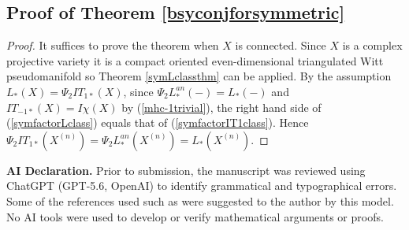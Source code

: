 \documentclass[11pt,leqno,twoside]{amsart}
\theoremstyle{plainsl}
\theoremstyle{definition}
\begin{document}
\subsection{Proof of Theorem \ref{bsyconjforsymmetric}}
\begin{proof} It suffices to prove the theorem when $X$ is connected.
 Since $X$ is a complex projective variety it is a compact oriented even-dimensional triangulated Witt pseudomanifold so Theorem \ref{symLclassthm} can be applied.
    By the assumption $L_*(X)=\Psi_2IT_{1*}(X)$, since $\Psi_2 L^{an}_*(-)=L_*(-)$ and $IT_{-1*}(X)=I\chi(X)$ by (\ref{mhc-1trivial}), the right hand side of (\ref{symfactorLclass}) equals that of (\ref{symfactorIT1class}). Hence $\Psi_2IT_{1*}(X^{(n)})=\Psi_2 L^{an}_*(X^{(n)})=L_*(X^{(n)})$.
\end{proof}







{\bf AI Declaration.} Prior to submission, the manuscript was reviewed using ChatGPT (GPT-5.6, OpenAI) to identify grammatical  and typographical errors. Some of the references used such as \cite{SV,CEKN,HW,Sag} were suggested to the author by this model. No AI tools were used to develop or verify mathematical arguments or proofs.
\end{document}
